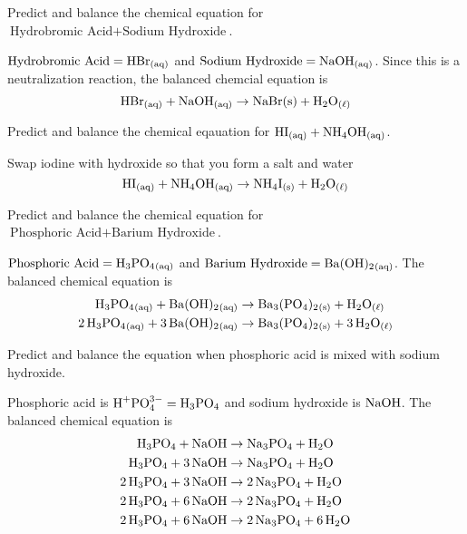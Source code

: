 \documentclass[12pt]{report}
\begin{document}
\begin{+problems}
    \item{Predict and balance the chemical equation for $ \text{Hydrobromic Acid}+ \text{Sodium Hydroxide}$.}
        \begin{solution}
            $ \text{Hydrobromic Acid}= \ce{HBr_{(aq)}}$ and $ \text{Sodium Hydroxide}= \ce{NaOH_{(aq)}}$. Since this is a neutralization reaction, the balanced chemcial equation is 
            \[
                \ce{HBr_{(aq)}}+ \ce{NaOH_{(aq)}}\to \ce{NaBr{(s)}}+ \ce{H2O_{( \ell )}}
            \]
        \end{solution}

    \item{Predict and balance the chemical eqauation for $\ce{HI_{(aq)}}+ \ce{NH4OH_{(aq)}}$.}
        \begin{solution} 
            Swap iodine with hydroxide so that you form a salt and water 
            \[
                \ce{HI_{(aq)}}+ \ce{NH4OH_{(aq)}}\to \ce{NH4I_{(s)}}+ \ce{H2O_{( \ell )}} 
            \]
        \end{solution}

    \item{Predict and balance the chemical equation for $ \text{Phosphoric Acid}+ \text{Barium Hydroxide}$.}
        \begin{solution}
            $ \text{Phosphoric Acid}= \ce{H3PO4_{(aq)}}$ and $ \text{Barium Hydroxide}= \ce{Ba(OH)2_{(aq)}}$. The balanced chemical equation is 
            \begin{align*}
                \ce{H3PO4_{(aq)}}+ \ce{Ba(OH)2_{(aq)}}&\to \ce{Ba3(PO4)2_{(s)}}+ \ce{H2O_{( \ell )}}\\ 
                \ce{2H3PO4_{(aq)}}+ \ce{3Ba(OH)2_{(aq)}}&\to \ce{Ba3(PO4)2_{(s)}}+ \ce{3H2O_{( \ell )}}
            \end{align*}
        \end{solution}
    \item{Predict and balance the equation when phosphoric acid is mixed with sodium hydroxide.}
        \begin{solution}
            Phosphoric acid is $\text{H}^{+} \text{PO}^{3-}_{4}= \ce{H3PO4}$ and sodium hydroxide is $\ce{NaOH}$. The balanced chemical equation is 
            \begin{align*}
                \ce{H3PO4}+ \ce{NaOH}&\to \ce{Na3PO4}+ \ce{H2O}\\
                \ce{H3PO4}+ \ce{3NaOH}&\to \ce{Na3PO4}+ \ce{H2O}\\
                \ce{2H3PO4}+ \ce{3NaOH}&\to \ce{2Na3PO4}+ \ce{H2O}\\
                \ce{2H3PO4}+ \ce{6NaOH}&\to \ce{2Na3PO4}+ \ce{H2O}\\ 
                \ce{2H3PO4}+ \ce{6NaOH}&\to \ce{2Na3PO4}+ \ce{6H2O}
            \end{align*}
        \end{solution}
\end{+problems}
\end{document}
